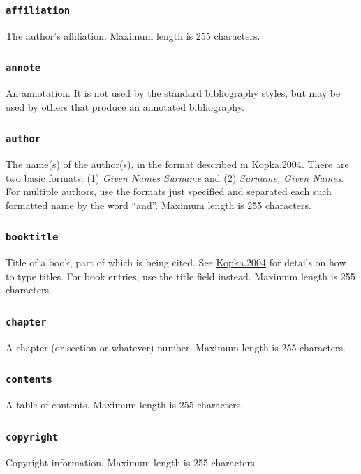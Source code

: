 \documentclass[letterpaper,10pt,english]{sphinxmanual}
\begin{document}
\subsubsection{\texttt{affiliation}}
\label{datastructure:affiliation}
The author's affiliation.  Maximum length is 255 characters.


\subsubsection{\texttt{annote}}
\label{datastructure:annote}
An annotation. It is not used by the standard bibliography styles, but may be
used by others that produce an annotated bibliography.


\subsubsection{\texttt{author}}
\label{datastructure:author}
The name(s) of the author(s), in the format described in {\hyperref[datastructure:kopka-2004]{Kopka.2004}}.  There are
two basic formats: (1) \emph{Given Names Surname} and (2) \emph{Surname, Given Names}.
For multiple authors, use the formats just specified and separated each such
formatted name by the word ``and''.  Maximum length is 255 characters.


\subsubsection{\texttt{booktitle}}
\label{datastructure:booktitle}
Title of a book, part of which is being cited. See {\hyperref[datastructure:kopka-2004]{Kopka.2004}} for details on
how to type titles.  For book entries, use the title field instead.  Maximum
length is 255 characters.


\subsubsection{\texttt{chapter}}
\label{datastructure:chapter}
A chapter (or section or whatever) number.  Maximum length is 255 characters.


\subsubsection{\texttt{contents}}
\label{datastructure:id41}
A table of contents.  Maximum length is 255 characters.


\subsubsection{\texttt{copyright}}
\label{datastructure:copyright}
Copyright information.  Maximum length is 255 characters.
\end{document}

